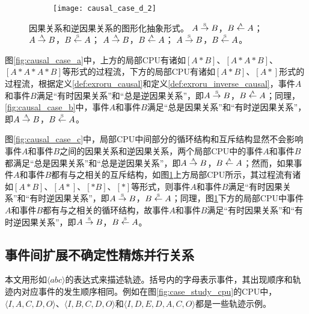\begin{figure}[htbp]
\begin{subfigure}{0.85\textwidth}
\begin{minipage}[b]{1\textwidth}
  	  \centering
  	  \texttt{[image: causal\_case\_d\_2]}
  	\end{minipage}
  	\caption{}
  	\label{fig:causal_case_d}
  \end{subfigure}
  \caption{因果关系和逆因果关系的图形化抽象形式。 $A\overset{\text{\tiny{S}}}{\rightarrow}B$，$B\overset{\text{\tiny{A}}}{\leftarrow}A$； $A\overset{\text{\tiny{A}}}{\rightarrow}B$，$B\overset{\text{\tiny{S}}}{\leftarrow}A$； $A\overset{\text{\tiny{A}}}{\rightarrow}B$，$B\overset{\text{\tiny{A}}}{\leftarrow}A$； $A\overset{\text{\tiny{S}}}{\rightarrow}B$，$B\overset{\text{\tiny{S}}}{\leftarrow}A$。}
  \label{fig:causal_case_formulas}
\end{figure}

图\ref{fig:causal_case_a}中，上方的局部CPU有诸如$[A*B]$、$[A*A*B]$、$[A*A*A*B]$等形式的过程流，下方的局部CPU有诸如$[A*B]$、$[A*]$形式的过程流，根据定义\ref{def:exroru_causal}和定义\ref{def:exroru_inverse_causal}，事件$A$和事件$B$满足“有时因果关系”和“总是逆因果关系”，即$A\overset{\text{\tiny{S}}}{\rightarrow}B$，$B\overset{\text{\tiny{A}}}{\leftarrow}A$；同理，\ref{fig:causal_case_b}中，事件$A$和事件$B$满足“总是因果关系”和“有时逆因果关系”，即$A\overset{\text{\tiny{A}}}{\rightarrow}B$，$B\overset{\text{\tiny{S}}}{\leftarrow}A$。

图\ref{fig:causal_case_c}中，局部CPU中间部分的循环结构和互斥结构显然不会影响事件$A$和事件$B$之间的因果关系和逆因果关系，两个局部CPU中的事件$A$和事件$B$都满足“总是因果关系”和“总是逆因果关系”，即$A\overset{\text{\tiny{A}}}{\rightarrow}B$，$B\overset{\text{\tiny{A}}}{\leftarrow}A$；然而，如果事件$A$和事件$B$都有与之相关的互斥结构，如图\ref{fig:causal_case_d}上方局部CPU所示，其过程流有诸如$[A*B]$、$[A*]$、$[*B]$、$[*]$等形式，则事件$A$和事件$B$满足“有时因果关系”和“有时逆因果关系”，即$A\overset{\text{\tiny{S}}}{\rightarrow}B$，$B\overset{\text{\tiny{S}}}{\leftarrow}A$；同理，图\ref{fig:causal_case_d}下方的局部CPU中事件$A$和事件$B$都有与之相关的循环结构，故事件$A$和事件$B$满足“有时因果关系”和“有时逆因果关系”，即$A\overset{\text{\tiny{S}}}{\rightarrow}B$，$B\overset{\text{\tiny{S}}}{\leftarrow}A$。

\subsection{事件间扩展不确定性精炼并行关系}\label{subsec:exroru_concurrent}
本文用形如$\langle abc\rangle$的表达式来描述轨迹。括号内的字母表示事件，其出现顺序和轨迹内对应事件的发生顺序相同。例如在图\ref{fig:case_study_cpu}的CPU中，$\langle I,A,C,D,O\rangle$、$\langle I,B,C,D,O\rangle$和$\langle I,D,E,D,A,C,O\rangle$都是一些轨迹示例。

